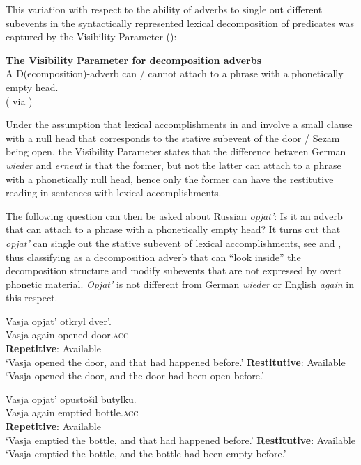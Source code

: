 \documentclass[output=paper]{langscibook}
\begin{document}
\noindent This variation with respect to the ability of adverbs to single out different subevents in the syntactically represented lexical decomposition of predicates was captured by the Visibility Parameter (\citealt{Rapp-vonStechow1999,Beck2005}):


 \ea\label{ex:bondarenko:15}
\textbf{The Visibility Parameter for decomposition adverbs}\\
A D(ecomposition)-adverb can / cannot attach to a phrase with a phonetically empty head.\\
\hfill(\citealt{Rapp-vonStechow1999} via \citealt[13]{Beck2005})
\z

\noindent Under the assumption that lexical accomplishments in  and  involve a small clause with a null head that corresponds to the stative subevent of the door / Sezam being open, the Visibility Parameter states that the difference between German \textit{wieder} and \textit{erneut} is that the former, but not the latter can attach to a phrase with a phonetically null head, hence only the former can have the restitutive reading in sentences with lexical accomplishments.



The following question can then be asked about Russian \textit{opjat’}: Is it an adverb that can attach to a phrase with a phonetically empty head? It turns out that \textit{opjat’} can single out the stative subevent of lexical accomplishments, see  and , thus classifying as a decomposition adverb that can “look inside” the decomposition structure and modify subevents that are not expressed by overt phonetic material. \textit{Opjat’} is not different from German \textit{wieder} or English \textit{again} in this respect.\largerpage[-1]


 \ea\label{ex:bondarenko:16}
\gll Vasja opjat’ otkryl dver’.\\
     Vasja again opened door.\textsc{acc}\\
\ea \textbf{Repetitive}: Available\\
`Vasja opened the door, and that had happened before.'
\ex \textbf{Restitutive}: Available\\
`Vasja opened the door, and the door had been open before.'
\z
\z

 \ea\label{ex:bondarenko:17}
\gll Vasja opjat’ opustošil butylku.\\
     Vasja again emptied bottle.\textsc{acc}\\
\ea \textbf{Repetitive}: Available\\
`Vasja emptied the bottle, and that had happened before.'
\ex \textbf{Restitutive}: Available\\
`Vasja emptied the bottle, and the bottle had been empty   before.'
\z
\z
\end{document}
